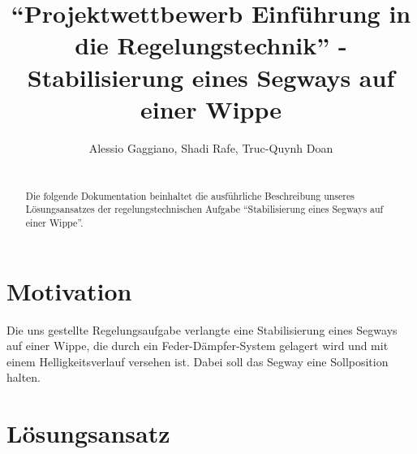 \documentclass[pdf]{ifacconf}
\begin{document}
\begin{frontmatter}

\title{``Projektwettbewerb Einführung in die Regelungstechnik'' - Stabilisierung eines
Segways auf einer
Wippe}


\author{Alessio Gaggiano, Shadi Rafe, Truc-Quynh Doan} 

\begin{abstract}\\                          %
Die folgende Dokumentation beinhaltet die ausführliche Beschreibung unseres Lösungsansatzes der regelungstechnischen Aufgabe ``Stabilisierung eines Segways auf einer Wippe''. 
\end{abstract}

\end{frontmatter}

\section{Motivation}

Die uns gestellte Regelungsaufgabe verlangte eine Stabilisierung eines Segways auf einer Wippe, die durch ein Feder-Dämpfer-System gelagert wird und mit einem Helligkeitsverlauf versehen ist. Dabei soll das Segway eine Sollposition halten. 


\section{Lösungsansatz}

\end{document}
